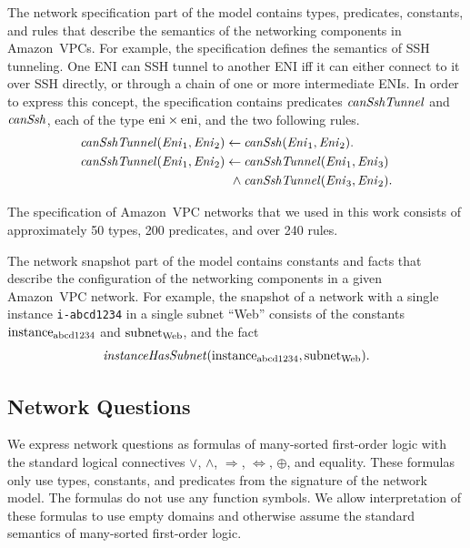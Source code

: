 The network specification part of the model contains types, predicates, constants, and rules that describe the semantics of the networking components in Amazon~VPCs. For example, the specification defines the semantics of SSH tunneling. One ENI can SSH tunnel to another ENI iff it can either connect to it over SSH directly, or through a chain of one or more intermediate ENIs. In order to express this concept, the specification contains predicates $\mathit{canSshTunnel}$ and $\mathit{canSsh}$, each of the type $\mathrm{eni}\times\mathrm{eni}$, and the two following rules.
\begin{align*}
\mathit{canSshTunnel}(\mathit{Eni}_1,\mathit{Eni}_2)\leftarrow\:&\mathit{canSsh}(\mathit{Eni}_1,\mathit{Eni}_2). \\
\mathit{canSshTunnel}(\mathit{Eni}_1,\mathit{Eni}_2)\leftarrow\:&\mathit{canSshTunnel}(\mathit{Eni}_1,\mathit{Eni}_3)\\
\wedge\:&\mathit{canSshTunnel}(\mathit{Eni}_3,\mathit{Eni}_2).
\end{align*}

The specification of Amazon~VPC networks that we used in this work consists of approximately 50 types, 200 predicates, and over 240 rules.

The network snapshot part of the model contains constants and facts that describe the configuration of the networking components in a given Amazon~VPC network. For example, the snapshot of a network with a single instance \verb'i-abcd1234' in a single subnet ``Web'' consists of the constants $\mathrm{instance}_\text{abcd1234}$ and $\mathrm{subnet}_\text{Web}$, and the fact $$\mathit{instanceHasSubnet}(\mathrm{instance}_\text{abcd1234},\mathrm{subnet}_\text{Web}).$$


\subsection{Network Questions}
\label{sect:aws/reachability/properties}

We express network questions as formulas of many-sorted first-order logic with the standard logical connectives $\vee$, $\wedge$, $\Rightarrow$, $\Leftrightarrow$, $\oplus$, and equality. These formulas only use types, constants, and predicates from the signature of the network model. The formulas do not use any function symbols. We allow interpretation of these formulas to use empty domains and otherwise assume the standard semantics of many-sorted first-order logic.

